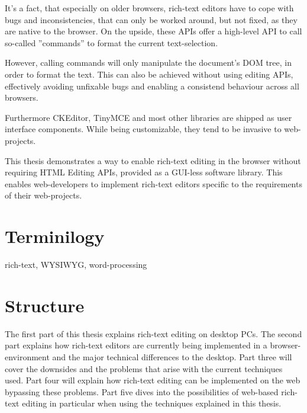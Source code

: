 It's a fact, that especially on older browsers, rich-text editors have to cope with bugs and inconsistencies, that can only be worked around, but not fixed, as they are native to the browser. On the upside, these APIs offer a high-level API to call so-called ''commands'' to format the current text-selection. 

However, calling commands will only manipulate the document's DOM tree, in order to format the text. This can also be achieved without using editing APIs, effectively avoiding unfixable bugs and enabling a consistend behaviour across all browsers.

Furthermore CKEditor, TinyMCE and most other libraries are shipped as user interface components. While being customizable, they tend to be invasive to web-projects.

This thesis demonstrates a way to enable rich-text editing in the browser without requiring HTML Editing APIs, provided as a GUI-less software library. This enables web-developers to implement rich-text editors specific to the requirements of their web-projects.

\section{Terminilogy}

rich-text, WYSIWYG, word-processing

\section{Structure}

The first part of this thesis explains rich-text editing on desktop PCs. The second part explains how rich-text editors are currently being implemented in a browser-environment and the major technical differences to the desktop. Part three will cover the downsides and the problems that arise with the current techniques used. Part four will explain how rich-text editing can be implemented on the web bypassing these problems. Part five dives into the possibilities of web-based rich-text editing in particular when using the techniques explained in this thesis.


